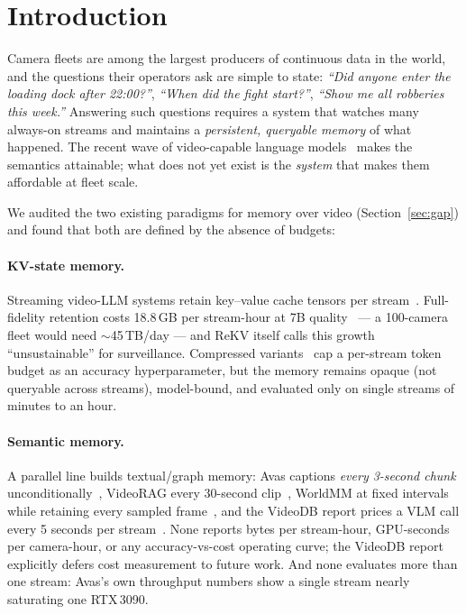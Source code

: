\section{Introduction}
\label{sec:intro}

Camera fleets are among the largest producers of continuous data in the world, and the questions their operators ask are simple to state: \emph{``Did anyone enter the loading dock after 22:00?''}, \emph{``When did the fight start?''}, \emph{``Show me all robberies this week.''} Answering such questions requires a system that watches many always-on streams and maintains a \emph{persistent, queryable memory} of what happened. The recent wave of video-capable language models~\cite{qwen25vl,internvl,llavaov} makes the semantics attainable; what does not yet exist is the \emph{system} that makes them affordable at fleet scale.

We audited the two existing paradigms for memory over video (Section~\ref{sec:gap}) and found that both are defined by the absence of budgets:

\paragraph{KV-state memory.} Streaming video-LLM systems retain key--value cache tensors per stream~\cite{rekv,livevlm,streammem,streamingvlm}. Full-fidelity retention costs 18.8\,GB per stream-hour at 7B quality~\cite{rekv} --- a 100-camera fleet would need $\sim$45\,TB/day --- and ReKV itself calls this growth ``unsustainable'' for surveillance. Compressed variants~\cite{livevlm,streammem} cap a per-stream token budget as an accuracy hyperparameter, but the memory remains opaque (not queryable across streams), model-bound, and evaluated only on single streams of minutes to an hour.

\paragraph{Semantic memory.} A parallel line builds textual/graph memory: Avas captions \emph{every 3-second chunk} unconditionally~\cite{avas}, VideoRAG every 30-second clip~\cite{videoraghkuds}, WorldMM at fixed intervals while retaining every sampled frame~\cite{worldmm}, and the VideoDB report prices a VLM call every 5 seconds per stream~\cite{videodb}. None reports bytes per stream-hour, GPU-seconds per camera-hour, or any accuracy-vs-cost operating curve; the VideoDB report explicitly defers cost measurement to future work. And none evaluates more than one stream: Avas's own throughput numbers show a single stream nearly saturating one RTX\,3090.

